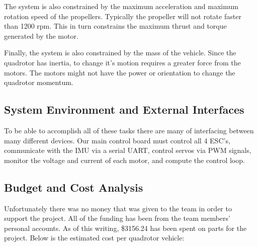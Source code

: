 \documentclass{article}
\numberwithin{equation}{section} %
\begin{document}
The system is also constrained by the maximum acceleration and maximum rotation speed of the propellers. Typically the propeller will not rotate faster than 1200 rpm. This in turn constrains the maximum thrust and torque generated by the motor.

Finally, the system is also constrained by the mass of the vehicle. Since the quadrotor has inertia, to change it's motion requires a greater force from the motors. The motors might not have the power or orientation to change the quadrotor momentum.


\subsection{System Environment and External Interfaces}

To be able to accomplish all of these tasks there are many of interfacing between many different devices. Our main control board must control all 4 ESC's, communicate with the IMU via a serial UART, control servos via PWM signals, monitor the voltage and current of each motor, and compute the control loop.

\subsection{Budget and Cost Analysis}
Unfortunately there was no money that was given to the team in order to support the project. All of the funding has been from the team members' personal accounts. As of this writing, \$3156.24 has been spent on parts for the project. Below is the estimated cost per quadrotor vehicle:
\end{document}
